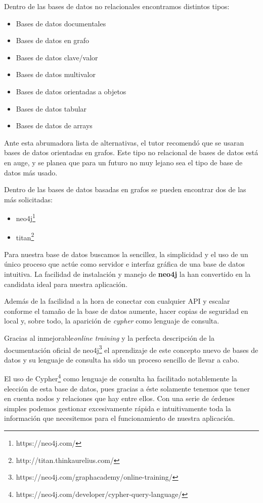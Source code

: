 Dentro de las bases de datos no relacionales encontramos distintos tipos:

\begin{itemize}
    \item Bases de datos documentales
    \item Bases de datos en grafo
    \item Bases de datos clave/valor
    \item Bases de datos multivalor
    \item Bases de datos orientadas a objetos
    \item Bases de datos tabular
    \item Bases de datos de arrays
\end{itemize}

Ante esta abrumadora lista de alternativas, el tutor recomendó que se usaran bases de datos orientadas en grafos. Este tipo no relacional de bases de datos está en auge, y se planea que para un futuro no muy lejano sea el tipo de base de datos más usado\cite{bdnorel1}\cite{bdnorel2}. 

Dentro de las bases de datos basadas en grafos se pueden encontrar dos de las más solicitadas:

\begin{itemize}
    \item neo4j\footnote{https://neo4j.com/}
    \item titan\footnote{http://titan.thinkaurelius.com/}
\end{itemize}

Para nuestra base de datos buscamos la sencillez, la simplicidad y el uso de un único proceso que actúe como servidor e interfaz gráfica de una base de datos intuitiva. La facilidad de instalación y manejo de \textbf{neo4j} la han convertido en la candidata ideal para nuestra aplicación. 

Además de la facilidad a la hora de conectar con cualquier API y escalar conforme el tamaño de la base de datos aumente, hacer copias de seguridad en local y, sobre todo, la aparición de \textit{cypher} como lenguaje de consulta\cite{neovstitan}.

Gracias al inmejorable\textit{online training} y la perfecta descripción de la documentación oficial de neo4j\footnote{https://neo4j.com/graphacademy/online-training/} el aprendizaje de este concepto nuevo de bases de datos y su lenguaje de consulta ha sido un proceso sencillo de llevar a cabo.

El uso de Cypher\footnote{https://neo4j.com/developer/cypher-query-language/} como lenguaje de consulta ha facilitado notablemente la elección de esta base de datos, pues gracias a éste solamente tenemos que tener en cuenta nodos y relaciones que hay entre ellos. Con una serie de órdenes simples podemos gestionar excesivamente rápida e intuitivamente toda la información que necesitemos para el funcionamiento de nuestra aplicación.

